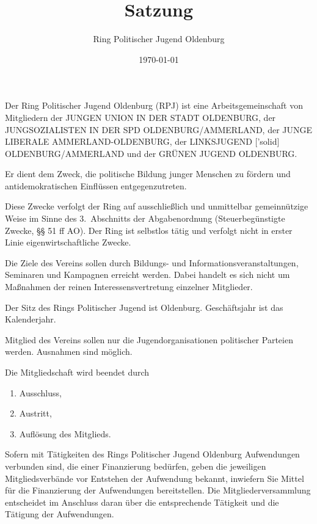 \documentclass[10pt,a4paper,oneside,parskip=half]{scrartcl}
\title{Satzung}
\date{\today}
\author{Ring Politischer Jugend Oldenburg}
\begin{document}
\maketitle

\begin{contract}

Der Ring Politischer Jugend Oldenburg (RPJ) ist eine Arbeitsgemeinschaft von Mitgliedern der JUNGEN UNION IN DER STADT OLDENBURG, der JUNGSOZIALISTEN IN DER SPD OLDENBURG/AMMERLAND, der JUNGE LIBERALE AMMERLAND-OLDENBURG, der LINKSJUGEND ['solid] OLDENBURG/AMMERLAND und der GRÜNEN JUGEND OLDENBURG.

Er dient dem Zweck, die politische Bildung junger Menschen zu fördern und antidemokratischen Einflüssen entgegenzutreten.

Diese Zwecke verfolgt der Ring auf ausschließlich und unmittelbar gemeinnützige Weise im Sinne des 3.~Abschnitts der Abgabenordnung (Steuerbegünstigte Zwecke, §§ 51 ff AO). Der Ring ist selbstlos tätig und verfolgt nicht in erster Linie eigenwirtschaftliche Zwecke.

Die Ziele des Vereins sollen durch Bildungs- und Informationsveranstaltungen, Seminaren und Kampagnen erreicht werden. Dabei handelt es sich nicht um Maßnahmen der reinen Interessensvertretung einzelner Mitglieder.

Der Sitz des Rings Politischer Jugend ist Oldenburg. Geschäftsjahr ist das Kalenderjahr.

Mitglied des Vereins sollen nur die Jugendorganisationen politischer Parteien werden. Ausnahmen sind möglich.

Die Mitgliedschaft wird beendet durch
\begin{enumerate}
\item Ausschluss,
\item Austritt,
\item Auflösung des Mitglieds.
\end{enumerate}

Sofern mit Tätigkeiten des Rings Politischer Jugend Oldenburg Aufwendungen verbunden sind, die einer Finanzierung bedürfen, geben die jeweiligen Mitgliedsverbände vor Entstehen der Aufwendung bekannt, inwiefern Sie Mittel für die Finanzierung der Aufwendungen bereitstellen. Die Mitgliederversammlung entscheidet im Anschluss daran über die entsprechende Tätigkeit und die Tätigung der Aufwendungen.


\end{contract}
\end{document}
